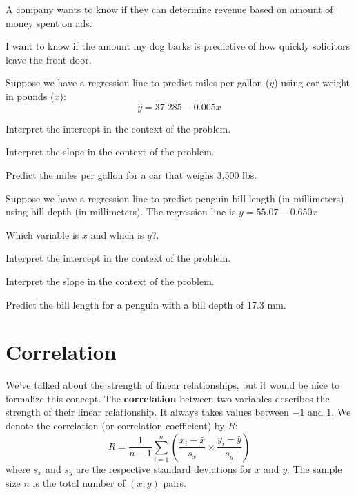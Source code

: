 \documentclass[
]{book}
\begin{document}
A company wants to know if they can determine revenue based on amount of money spent on ads.

I want to know if the amount my dog barks is predictive of how quickly solicitors leave the front door.

Suppose we have a regression line to predict miles per gallon (\(y\))
using car weight in pounds (\(x\)): \[\hat{y} = 37.285 - 0.005x\]

Interpret the intercept in the context of the problem.

Interpret the slope in the context of the problem.

Predict the miles per gallon for a car that weighs 3,500
lbs.

Suppose we have a regression line to predict penguin bill length (in
millimeters) using bill depth (in millimeters). The regression line
is \(y = 55.07 - 0.650x\).

Which variable is \(x\) and which is \(y\)?.

Interpret the intercept in the context of the problem.

Interpret the slope in the context of the problem.

Predict the bill length for a penguin with a bill depth of 17.3
mm.

\section{Correlation}\label{correlation}

We've talked about the strength of linear relationships, but it would be
nice to formalize this concept. The \textbf{correlation} between two
variables describes the strength of their linear relationship. It always
takes values between \(-1\) and \(1\). We denote the correlation (or
correlation coefficient) by \(R\):
\[R = \frac{1}{n-1}\sum_{i=1}^n\left(\frac{x_i - \bar{x}}{s_x}\times\frac{y_i - \bar{y}}{s_y}\right)\]
where \(s_x\) and \(s_y\) are the respective standard deviations for \(x\) and
\(y\). The sample size \(n\) is the total number of \((x,y)\) pairs.
\end{document}
